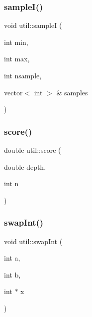 \mbox{\label{namespaceutil_ab4e338c554526c6a942fc35d14b15beb}} 
\subsubsection{\texorpdfstring{sample\+I()}{sampleI()}\hspace{0.1cm}{\footnotesize\ttfamily [2/2]}}
{\footnotesize\ttfamily void util\+::sampleI (\begin{DoxyParamCaption}\item[{int}]{min,  }\item[{int}]{max,  }\item[{int}]{nsample,  }\item[{vector$<$ int $>$ \&}]{samples }\end{DoxyParamCaption})}

\mbox{\label{namespaceutil_a71809e272f5a9c8e8297bab2c12666f7}} 
\subsubsection{\texorpdfstring{score()}{score()}}
{\footnotesize\ttfamily double util\+::score (\begin{DoxyParamCaption}\item[{double}]{depth,  }\item[{int}]{n }\end{DoxyParamCaption})}

\mbox{\label{namespaceutil_a8a222a481a56e4070f023d369483f707}} 
\subsubsection{\texorpdfstring{swap\+Int()}{swapInt()}\hspace{0.1cm}{\footnotesize\ttfamily [1/2]}}
{\footnotesize\ttfamily void util\+::swap\+Int (\begin{DoxyParamCaption}\item[{int}]{a,  }\item[{int}]{b,  }\item[{int $\ast$}]{x }\end{DoxyParamCaption})}

